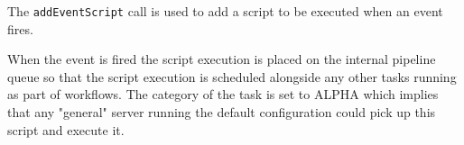 The \verb+addEventScript+ call is used to add a \Reflex script to be executed when an event fires.

When the event is fired the script execution is placed on the internal pipeline queue so that the script
execution is scheduled alongside any other tasks running as part of workflows. The category of the task is set to
ALPHA which implies that any "general" \Rapture server running the default configuration could pick up this script and
execute it.

